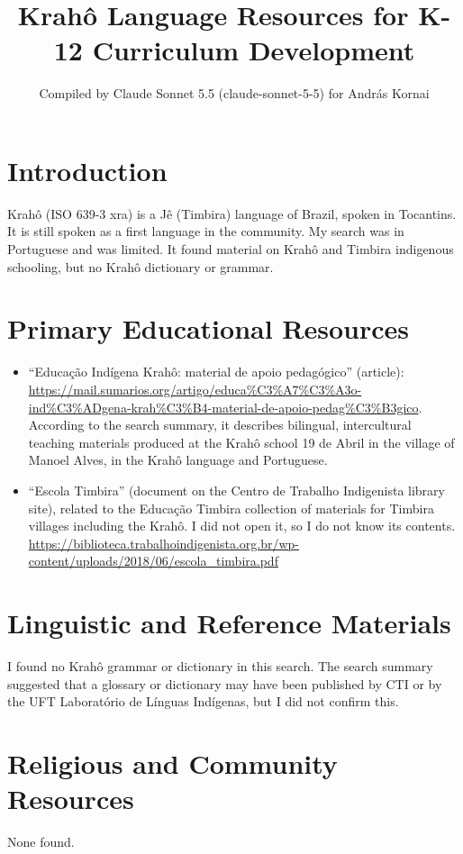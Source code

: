 \documentclass[12pt]{article}
\title{Krah\^o Language Resources for K-12 Curriculum Development}
\author{Compiled by Claude Sonnet 5.5 (claude-sonnet-5-5) for Andr\'as Kornai}
\date{}
\begin{document}
\maketitle

\section{Introduction}
Krah\^o (ISO 639-3 xra) is a Jê (Timbira) language of Brazil, spoken in Tocantins. It is still spoken as a first language in the community. My search was in Portuguese and was limited. It found material on Krah\^o and Timbira indigenous schooling, but no Krah\^o dictionary or grammar.

\section{Primary Educational Resources}
\begin{itemize}
\item ``Educa\c{c}\~ao Ind\'igena Krah\^o: material de apoio pedag\'ogico'' (article): \url{https://mail.sumarios.org/artigo/educa%C3%A7%C3%A3o-ind%C3%ADgena-krah%C3%B4-material-de-apoio-pedag%C3%B3gico}. According to the search summary, it describes bilingual, intercultural teaching materials produced at the Krah\^o school 19 de Abril in the village of Manoel Alves, in the Krah\^o language and Portuguese.
\item ``Escola Timbira'' (document on the Centro de Trabalho Indigenista library site), related to the Educa\c{c}\~ao Timbira collection of materials for Timbira villages including the Krah\^o. I did not open it, so I do not know its contents. \url{https://biblioteca.trabalhoindigenista.org.br/wp-content/uploads/2018/06/escola_timbira.pdf}
\end{itemize}

\section{Linguistic and Reference Materials}
I found no Krah\^o grammar or dictionary in this search. The search summary suggested that a glossary or dictionary may have been published by CTI or by the UFT Laborat\'orio de L\'inguas Ind\'igenas, but I did not confirm this.

\section{Religious and Community Resources}
None found.
\end{document}
